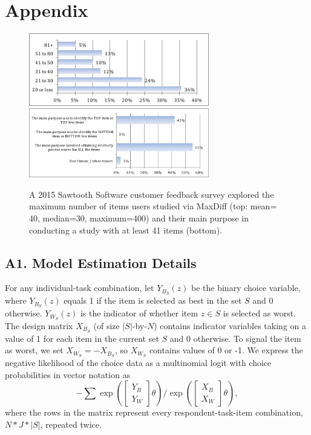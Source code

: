 \documentclass[a4paper,11pt]{article}
\begin{document}

\newpage

\section*{Appendix} 


\begin{figure}
\caption{A 2015 Sawtooth Software customer feedback survey explored the maximum number of items users studied via MaxDiff (top: mean= 40, median=30, maximum=400) and their main purpose in conducting a study with at least 41 items (bottom). } 
\label{fig:max_and_purpose}
\begin{center} 
\includegraphics[width=0.7\textwidth]{plots/maxnumstudy}
\includegraphics[width=0.7\textwidth]{plots/maxdiffpurpose}
\end{center}
\end{figure}


\subsection*{A1. Model Estimation Details}
For any individual-task combination, let $Y_{B_S}(z)$ be the binary choice variable, where $Y_{B_S}(z)$ equals 1 if the item is selected as best in the set $S$ and 0 otherwise. $Y_{W_S}(z)$ is the indicator of whether item $z \in S$ is selected as worst. The design matrix $X_{B_S}$ (of size $|S|$-by-$N$) contains indicator variables taking on a value of 1 for each item in the current set $S$ and 0 otherwise. To signal the item as worst, we set $X_{W_S}=-X_{B_S}$, so $X_{W_S}$ contains values of 0 or -1. We express the negative likelihood of the choice data as a multinomial logit with choice probabilities in vector notation as
\[
-\sum
\exp{(\begin{bmatrix}Y_B\\Y_W\end{bmatrix}\theta)} / \exp{(\begin{bmatrix}X_B\\X_W\end{bmatrix}\theta)},
\]
where the rows in the matrix represent every respondent-task-item combination, $N*J*|S|$, repeated twice.  
\end{document}
